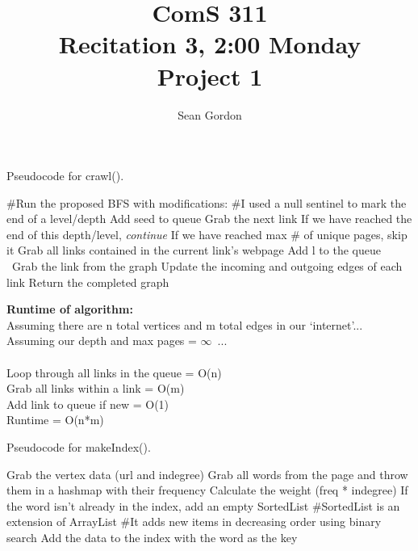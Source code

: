 \documentclass[12pt]{article}
\title{ComS 311\\Recitation 3, 2:00 Monday\\Project 1}
\author{Sean Gordon}
\begin{document}
\maketitle

\pagebreak 

\begin{algorithm}[H]
\caption{Pseudocode for crawl().}
\begin{algorithmic}
\State \#Run the proposed BFS with modifications:
\State \#I used a null sentinel to mark the end of a level/depth
\State Add seed to queue
\State Grab the next link
\State If we have reached the end of this depth/level, \textit{continue}
\State 
{}
\State If we have reached max \# of unique pages, skip it
\State 
\State Grab all links contained in the current link's webpage
\State Add l to the queue
\EndFor
\Else \ Grab the link from the graph
\EndIf
\State Update the incoming and outgoing edges of each link
\EndWhile
\State Return the completed graph
\end{algorithmic}
\end{algorithm}

\noindent \textbf{Runtime of algorithm:} \\
Assuming there are n total vertices and m total edges in our `internet'...\\
Assuming our depth and max pages = $\infty$\ ...\\\\
Loop through all links in the queue = O(n)\\
Grab all links within a link = O(m)\\
Add link to queue if new = O(1)\\

\noindent Runtime = O(n*m)


\pagebreak 

\begin{algorithm}[H]
\caption{Pseudocode for makeIndex().}
\begin{algorithmic}
\State Grab the vertex data (url and indegree)
\State Grab all words from the page and throw them in a hashmap with their frequency
\State Calculate the weight (freq * indegree)
\State 
\State If the word isn't already in the index, add an empty SortedList
\State \#SortedList is an extension of ArrayList
\State \#It adds new items in decreasing order using binary search
\State 
\State Add the data to the index with the word as the key
\EndFor
\EndFor
\end{algorithmic}
\end{algorithm}
\end{document}
